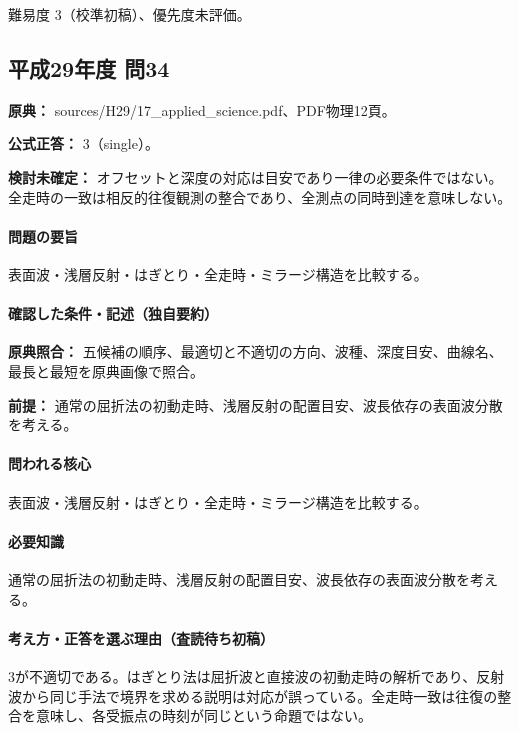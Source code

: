 \par 難易度 3（校準初稿）、優先度未評価。

\subsection{平成29年度 問34}
\label{q:h29-reg-applied-34}

\noindent\textbf{原典：} sources/H29/17\_applied\_science.pdf、PDF物理12頁。

\textbf{公式正答：} 3（single）。

\par\textbf{検討未確定：} オフセットと深度の対応は目安であり一律の必要条件ではない。全走時の一致は相反的往復観測の整合であり、全測点の同時到達を意味しない。

\paragraph{問題の要旨} 表面波・浅層反射・はぎとり・全走時・ミラージ構造を比較する。

\paragraph{確認した条件・記述（独自要約）}\mbox{}\par

\noindent\textbf{原典照合：} 五候補の順序、最適切と不適切の方向、波種、深度目安、曲線名、最長と最短を原典画像で照合。\par

\noindent\textbf{前提：} 通常の屈折法の初動走時、浅層反射の配置目安、波長依存の表面波分散を考える。\par

\paragraph{問われる核心} 表面波・浅層反射・はぎとり・全走時・ミラージ構造を比較する。

\paragraph{必要知識} 通常の屈折法の初動走時、浅層反射の配置目安、波長依存の表面波分散を考える。

\paragraph{考え方・正答を選ぶ理由（査読待ち初稿）} 3が不適切である。はぎとり法は屈折波と直接波の初動走時の解析であり、反射波から同じ手法で境界を求める説明は対応が誤っている。全走時一致は往復の整合を意味し、各受振点の時刻が同じという命題ではない。

